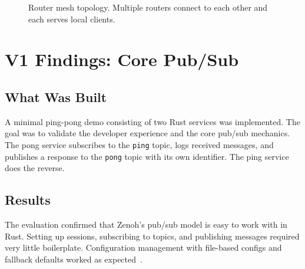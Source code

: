 \documentclass[11pt,a4paper]{article}
\begin{document}
\begin{figure}[H]
  \centering
  \caption{Router mesh topology. Multiple routers connect to each
  other and each serves local clients.}
  \label{fig:topology-mesh}
\end{figure}

\section{V1 Findings: Core Pub/Sub}

\subsection{What Was Built}

A minimal ping-pong demo consisting of two Rust services was
implemented. The goal was to validate the developer experience and
the core pub/sub mechanics. The pong service subscribes to the
\texttt{ping} topic, logs received messages, and publishes a response
to the \texttt{pong} topic with its own identifier. The ping service
does the reverse.

\subsection{Results}

The evaluation confirmed that Zenoh's pub/sub model is easy to work
with in Rust. Setting up sessions, subscribing to topics, and
publishing messages required very little boilerplate. Configuration
management with file-based configs and fallback defaults worked as
expected~\citep{zenoh-config}.
\end{document}
